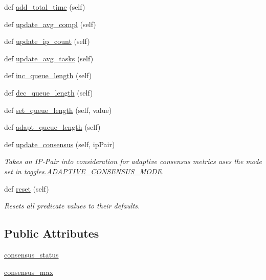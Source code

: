 \begin{DoxyCompactItemize}
def \mbox{\hyperlink{classdynamicfilterapp_1_1models_1_1_predicate_a5d9324dd67dcaae3edb112d23c33a9d8}{add\+\_\+total\+\_\+time}} (self)
\item 
def \mbox{\hyperlink{classdynamicfilterapp_1_1models_1_1_predicate_a5d8c939a3e8f1815ac4768caea92ea9e}{update\+\_\+avg\+\_\+compl}} (self)
\item 
def \mbox{\hyperlink{classdynamicfilterapp_1_1models_1_1_predicate_af28772c782daf9e16362c89252e4c75c}{update\+\_\+ip\+\_\+count}} (self)
\item 
def \mbox{\hyperlink{classdynamicfilterapp_1_1models_1_1_predicate_a46ea5633155540e0474830a73ece68de}{update\+\_\+avg\+\_\+tasks}} (self)
\item 
def \mbox{\hyperlink{classdynamicfilterapp_1_1models_1_1_predicate_a6e8c8ca5961ded4fefad793206ed2612}{inc\+\_\+queue\+\_\+length}} (self)
\item 
def \mbox{\hyperlink{classdynamicfilterapp_1_1models_1_1_predicate_adf2c6e37d925945ace447e024b31b87e}{dec\+\_\+queue\+\_\+length}} (self)
\item 
def \mbox{\hyperlink{classdynamicfilterapp_1_1models_1_1_predicate_adb36a52d2acdedc33d742d219e0acf7e}{set\+\_\+queue\+\_\+length}} (self, value)
\item 
def \mbox{\hyperlink{classdynamicfilterapp_1_1models_1_1_predicate_a18b5417d8a8cf64ffbc6bb32c2a573fa}{adapt\+\_\+queue\+\_\+length}} (self)
\item 
def \mbox{\hyperlink{classdynamicfilterapp_1_1models_1_1_predicate_a34ad16d30b9a279473a83b2c43dedfa1}{update\+\_\+consensus}} (self, ip\+Pair)
\begin{DoxyCompactList}\small\item\em Takes an I\+P-\/\+Pair into consideration for adaptive consensus metrics uses the mode set in \mbox{\hyperlink{namespacedynamicfilterapp_1_1toggles_a394fa3f8531c2ecc987f982367a4af2d}{toggles.\+A\+D\+A\+P\+T\+I\+V\+E\+\_\+\+C\+O\+N\+S\+E\+N\+S\+U\+S\+\_\+\+M\+O\+DE}}. \end{DoxyCompactList}\item 
def \mbox{\hyperlink{classdynamicfilterapp_1_1models_1_1_predicate_a51829b63adb24ac48d350dee60181002}{reset}} (self)
\begin{DoxyCompactList}\small\item\em Resets all predicate values to their defaults. \end{DoxyCompactList}\end{DoxyCompactItemize}
\subsection*{Public Attributes}
\begin{DoxyCompactItemize}
\item 
\mbox{\hyperlink{classdynamicfilterapp_1_1models_1_1_predicate_aed00cc02057c0555b36ade73a3403506}{consensus\+\_\+status}}
\item 
\mbox{\hyperlink{classdynamicfilterapp_1_1models_1_1_predicate_a2b21ce84993e15a328a68bcbbe8986ef}{consensus\+\_\+max}}
\end{DoxyCompactItemize}
